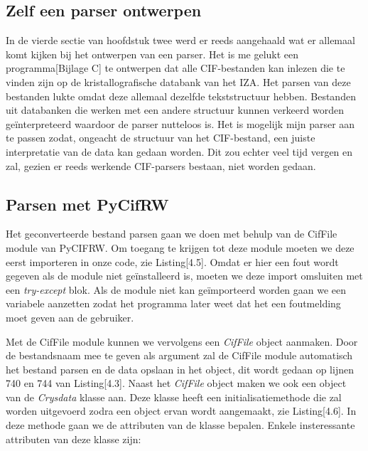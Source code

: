 \subsection{Zelf een parser ontwerpen}
In de vierde sectie van hoofdstuk twee werd er reeds aangehaald wat er allemaal komt kijken bij het ontwerpen van een parser. Het is me gelukt een programma[Bijlage C] te ontwerpen dat alle CIF-bestanden kan inlezen die te vinden zijn op de kristallografische databank van het IZA.\citep*{IZA1} Het parsen van deze bestanden lukte omdat deze allemaal dezelfde tekststructuur hebben. Bestanden uit databanken die werken met een andere structuur kunnen verkeerd worden geïnterpreteerd waardoor de parser nutteloos is. Het is mogelijk mijn parser aan te passen zodat, ongeacht de structuur van het CIF-bestand, een juiste interpretatie van de data kan gedaan worden. Dit zou echter veel tijd vergen en zal, gezien er reeds werkende CIF-parsers bestaan, niet worden gedaan.



\subsection{Parsen met PyCifRW}
Het geconverteerde bestand parsen gaan we doen met behulp van de CifFile module van PyCIFRW. Om toegang te krijgen tot deze module moeten we deze eerst importeren in onze code, zie Listing[4.5]. Omdat er hier een fout wordt gegeven als de module niet geïnstalleerd is, moeten we deze import omsluiten met een \textit{try-except} blok. Als de module niet kan geïmporteerd worden gaan we een variabele aanzetten zodat het programma later weet dat het een foutmelding moet geven aan de gebruiker.



Met de CifFile module kunnen we vervolgens een \textit{CifFile} object aanmaken. Door de bestandsnaam mee te geven als argument zal de CifFile module automatisch het bestand parsen en de data opslaan in het object, dit wordt gedaan op lijnen 740 en 744 van Listing[4.3]. Naast het \textit{CifFile} object maken we ook een object van de \textit{Crysdata} klasse aan. Deze klasse heeft een initialisatiemethode die zal worden uitgevoerd zodra een object ervan wordt aangemaakt, zie Listing[4.6]. In deze methode gaan we de attributen van de klasse bepalen. Enkele insteressante attributen van deze klasse zijn:

